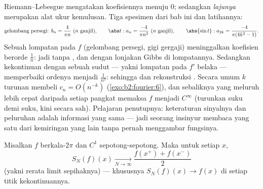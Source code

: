 \begin{example}\label{ex:b2:fourier:decaytable}
Riemann--Lebesgue mengatakan koefisiennya menuju $0$; sedangkan
\emph{lajunya} merupakan alat ukur kemulusan. Tiga spesimen dari bab
ini dan latihannya:
\[
\text{gelombang persegi: } b_n = \frac{4}{\pi n}\ (n\ \text{ganjil}),
\qquad
\abs t : a_n = \frac{-4}{\pi n^2}\ (n\ \text{ganjil}),
\qquad
\abs{\sin t} : a_{2k} = \frac{-4}{\pi(4k^2-1)} .
\]
Sebuah lompatan pada $f$ (gelombang persegi, gigi gergaji) meninggalkan
koefisien berorde $\frac1n$: jadi tanpa , dan dengan
lonjakan Gibbs di lompatannya. Sedangkan kekontinuan dengan sebuah sudut ---
yakni lompatan pada $f'$ belaka --- memperbaiki ordenya menjadi
$\frac{1}{n^2}$: sehingga  dan rekonstruksi .
Secara umum $k$ turunan membeli $c_n =
O(n^{-k})$ (\cref{exo:b2:fourier:6}), dan sebaliknya  yang
meluruh lebih cepat daripada setiap pangkat memaksa $f$ menjadi $C^\infty$
(turunkan suku demi suku, kini secara sah). Pelajaran
penutupnya: keteraturan sinyalnya dan peluruhan 
adalah informasi yang sama --- jadi seorang insinyur membaca yang satu dari
kemiringan yang lain tanpa pernah menggambar fungsinya.
\end{example}

\begin{theorem}[Dirichlet]\label{thm:b2:fourier:dirichlet}
Misalkan $f$ berkala-$2\pi$ dan $C^1$ sepotong-sepotong. Maka untuk setiap $x$,
\[
S_N(f)(x) \xrightarrow[N \to \infty]{}
\frac{f(x^+) + f(x^-)}{2}
\]
(yakni rerata limit sepihaknya) --- khususnya $S_N(f)(x) \to
f(x)$ di setiap titik kekontinuannya.
\end{theorem}


